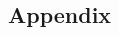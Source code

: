 \documentclass[english,12pt]{report}
\begin{document}
\begin{spacing}{1.5}





% 






\chapter{Appendix}





\begin{comment}

\chapter*{Acknowledgments}

\pagenumbering{gobble}




\end{comment}




\end{spacing}
\end{document}
